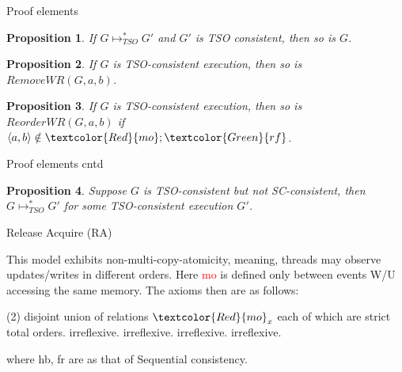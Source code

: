 \documentclass[xcolor={dvipsnames}, notes]{beamer}
\newtheorem{prop}{Proposition}
\newcommand{\rf}{\textcolor{Green}{rf}}
\newcommand{\mo}{\textcolor{Red}{mo}}
\newcommand{\hb}{\textcolor{NavyBlue}{hb}}
\newcommand{\fr}{\textcolor{RubineRed}{fr}}
\begin{document}
    \begin{frame}{Proof elements}

        \begin{prop}
            If $G \longmapsto^{*}_{TSO} G'$ and $G'$ is TSO consistent, then so is $G$.
        \end{prop}

        \begin{prop}
            If $G$ is TSO-consistent execution, then so is $RemoveWR(G,a,b)$.
        \end{prop}

        \begin{prop}
            If $G$ is TSO-consistent execution, then so is $ReorderWR(G,a,b)$ if $\langle a,b \rangle \notin \mo;\rf$.
        \end{prop}

    \end{frame}

    \begin{frame}{Proof elements cntd}
        \begin{prop}
            Suppose $G$ is TSO-consistent but not SC-consistent, then $G \longmapsto^{*}_{TSO} G'$ for some TSO-consistent execution $G'$.   
        \end{prop}
    \end{frame}

    \begin{frame}{Release Acquire (RA)}

        This model exhibits non-multi-copy-atomicity, meaning, threads may observe updates/writes in different orders.
        Here {\mo} is defined only between events W/U accessing the same memory.
        The axioms then are as follows:
        \begin{tasks}(2)
            \task {\mo} disjoint union of relations $\mo_{x}$ each of which are strict total orders. 
            \task {\hb} irreflexive.
            \task {\mo;\hb} irreflexive.
            \task {\fr;\hb} irreflexive.
            \task {\fr;\mo} irreflexive.
        \end{tasks}
        where {\hb}, {\fr} are as that of Sequential consistency.

    \end{frame}
\end{document}
